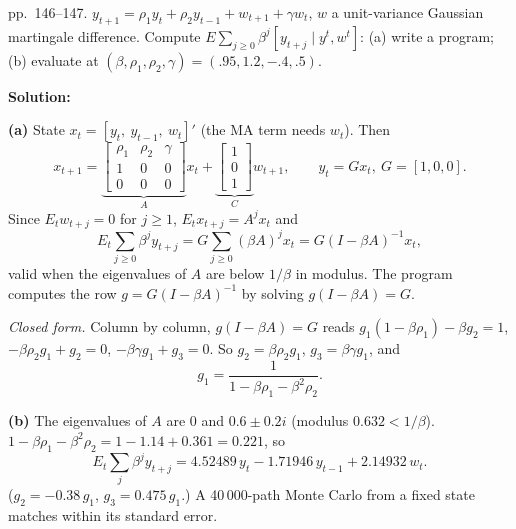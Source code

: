 \documentclass[12pt, letterpaper]{article}
\begin{document}
\begin{tcolorbox}[oddbox,title={Exercise 5.5 \quad Expected discounted sum of an ARMA(2,1)}]
\begin{tcolorbox}[questionbox]
pp.~146--147. $y_{t+1}=\rho_1y_t+\rho_2y_{t-1}+w_{t+1}+\gamma w_t$, $w$ a unit-variance Gaussian
martingale difference. Compute $E\sum_{j\ge0}\beta^j[y_{t+j}\mid y^t,w^t]$: (a) write a program;
(b) evaluate at $(\beta,\rho_1,\rho_2,\gamma)=(.95,1.2,-.4,.5)$.
\end{tcolorbox}

\textbf{Solution:}

\textbf{(a)} State $x_t=[y_t,\ y_{t-1},\ w_t]'$ (the MA term needs $w_t$). Then
\[
x_{t+1}=\underbrace{\begin{bmatrix}\rho_1&\rho_2&\gamma\\1&0&0\\0&0&0\end{bmatrix}}_{A}x_t
+\underbrace{\begin{bmatrix}1\\0\\1\end{bmatrix}}_{C}w_{t+1},\qquad y_t=Gx_t,\ G=[1,0,0].
\]
Since $E_tw_{t+j}=0$ for $j\ge1$, $E_tx_{t+j}=A^jx_t$ and
\[
E_t\sum_{j\ge0}\beta^jy_{t+j}=G\sum_{j\ge0}(\beta A)^jx_t=G(I-\beta A)^{-1}x_t,
\]
valid when the eigenvalues of $A$ are below $1/\beta$ in modulus. The program computes the row
$g=G(I-\beta A)^{-1}$ by solving $g(I-\beta A)=G$.

\emph{Closed form.} Column by column, $g(I-\beta A)=G$ reads
$g_1(1-\beta\rho_1)-\beta g_2=1$, $-\beta\rho_2g_1+g_2=0$, $-\beta\gamma g_1+g_3=0$. So
$g_2=\beta\rho_2g_1$, $g_3=\beta\gamma g_1$, and
\[
g_1=\frac{1}{1-\beta\rho_1-\beta^2\rho_2}.
\]

\textbf{(b)} The eigenvalues of $A$ are $0$ and $0.6\pm0.2i$ (modulus $0.632<1/\beta$).
$1-\beta\rho_1-\beta^2\rho_2=1-1.14+0.361=0.221$, so
\[
\boxed{E_t\sum_j\beta^jy_{t+j}=4.52489\,y_t-1.71946\,y_{t-1}+2.14932\,w_t.}
\]
($g_2=-0.38\,g_1$, $g_3=0.475\,g_1$.) A 40\,000-path Monte Carlo from a fixed state matches
within its standard error.
\end{tcolorbox}
\end{document}
